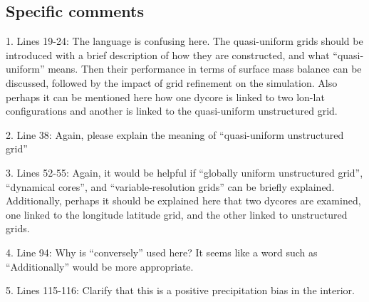 \documentclass[12pt,oneside,a4paper]{article}%
\begin{document}



\subsection*{Specific comments}

1. Lines 19-24: The language is confusing here. The quasi-uniform grids should be introduced with a brief description of how they are constructed, and what “quasi- uniform” means. Then their performance in terms of surface mass balance can be discussed, followed by the impact of grid refinement on the simulation. Also perhaps it can be mentioned here how one dycore is linked to two lon-lat configurations and another is linked to the quasi-uniform unstructured grid. \newline

2. Line 38: Again, please explain the meaning of “quasi-uniform unstructured grid”  \newline

3. Lines 52-55: Again, it would be helpful if “globally uniform unstructured grid”, “dynamical cores”, and “variable-resolution grids” can be briefly explained. Additionally, perhaps it should be explained here that two dycores are examined, one linked to the longitude latitude grid, and the other linked to unstructured grids.  \newline

4. Line 94: Why is “conversely” used here? It seems like a word such as “Additionally” would be more appropriate.  \newline

5. Lines 115-116: Clarify that this is a positive precipitation bias in the interior.  \newline
\end{document}

